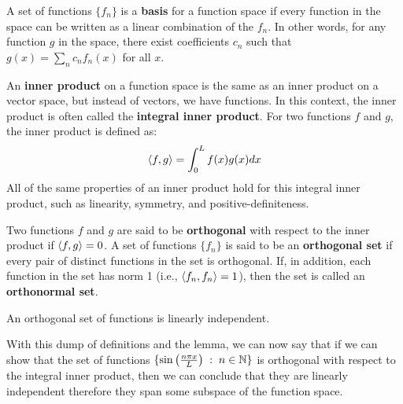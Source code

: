 \begin{definition}\label{def.basis}
    A set of functions $\{f_n\}$ is a \textbf{basis} for a function space if every function in the space can be written as a linear combination of the $f_n$. In other words, for any function $g$ in the space, there exist coefficients $c_n$ such that $g(x) = \sum_{n} c_n f_n(x)$ for all $x$.
\end{definition}

\begin{definition}\label{def.inner_product}
    An \textbf{inner product} on a function space is the same as an inner product on a vector space, but instead of vectors, we have functions. In this context, the inner product is often called the \textbf{integral inner product}. For two functions $f$ and $g$, the inner product is defined as:
    \[
    \langle f, g \rangle = \int_0^L f(x) g(x) dx
    \]
    All of the same properties of an inner product hold for this integral inner product, such as linearity, symmetry, and positive-definiteness.
\end{definition}

\begin{definition}\label{def.orthogonality}
    Two functions $f$ and $g$ are said to be \textbf{orthogonal} with respect to the inner product if $\langle f, g \rangle = 0$. A set of functions $\{f_n\}$ is said to be an \textbf{orthogonal set} if every pair of distinct functions in the set is orthogonal. If, in addition, each function in the set has norm 1 (i.e., $\langle f_n, f_n \rangle = 1$), then the set is called an \textbf{orthonormal set}.
\end{definition}

\begin{lemma}\label{lemma.ortho_implies_lin_indep}
    An orthogonal set of functions is linearly independent.
\end{lemma}

With this dump of definitions and the lemma, we can now say that if we can show that the set of functions $\{\sin\left(\frac{n \pi x}{L}\right) \;:\; n \in \mathbb{N} \}$ is orthogonal with respect to the integral inner product, then we can conclude that they are linearly independent therefore they span some subspace of the function space. 

